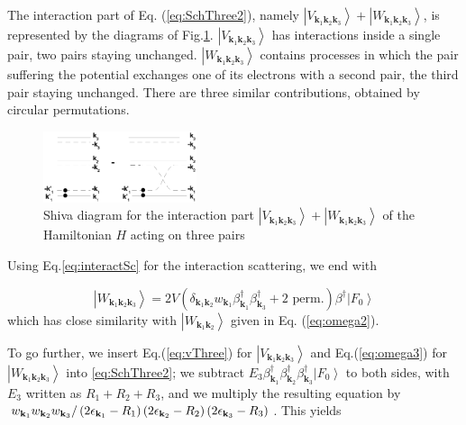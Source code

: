 \documentclass[aps,prb,superscriptaddress,showpacs,reprint,lengthcheck]{revtex4}
\begin{document}
The interaction part of Eq. (\ref{eq:SchThree2}), namely $\left|V_{\mathbf{k} _1\mathbf{k} _2%
\mathbf{k} _3}\right>+\left|W_{\mathbf{k} _1\mathbf{k} _2\mathbf{k} _3}\right> $, is represented by the diagrams of Fig.\ref{fig:threeP}. $\left|V_{\mathbf{k} _1\mathbf{k} _2
\mathbf{k} _3}\right>$ has interactions inside a single pair, two pairs
staying unchanged. $\left|W_{\mathbf{k} _1\mathbf{k} _2\mathbf{k} _3}\right> $ contains processes in which the pair suffering the potential exchanges one of its electrons with a second pair, the third pair staying unchanged.  There  are three similar  contributions, obtained by circular permutations.
\begin{figure}[htb]
   \includegraphics[width=0.4\textwidth]{threePair.eps}
\caption{Shiva diagram for the interaction part $\left|V_{\mathbf{k} _1\mathbf{k} _2
\mathbf{k} _3}\right> +\left|W_{\mathbf{k} _1\mathbf{k} _2
\mathbf{k} _3}\right>$ of the Hamiltonian $H$ acting on three pairs }\label{fig:threeP}
 \end{figure}

Using Eq.\eqref{eq:interactSc} for the interaction scattering, we end with

\begin{equation}\label{eq:omega3}
\left|W_{\mathbf{k} _1\mathbf{k} _2\mathbf{k} _3}\right>= 2V(\delta_{\mathbf{k} _1\mathbf{k} _2}w_{\mathbf{k} _1}\beta^{\dagger}_{\mathbf{k} _1}\beta^{\dagger}_{\mathbf{k} _3}+ \text{2 perm.})\beta^{\dagger}\left|F_0\right>
\end{equation}
which has close similarity with  $\left|W_{\mathbf{k} _1\mathbf{k} _2}\right> $ given in Eq. (\ref{eq:omega2}). 



To go further, we insert Eq.(\ref{eq:vThree}) for $\left|V_{\mathbf{k} _1\mathbf{k} _2\mathbf{k} _3}\right>$  and Eq.(\ref{eq:omega3}) for $\left|W_{\mathbf{k} _1\mathbf{k} _2\mathbf{k} _3}\right> $ into \eqref{eq:SchThree2}; we subtract $E
_3\beta^{\dagger}_{\mathbf{k} _1}\beta^{\dagger}_{\mathbf{k}
_2}\beta^{\dagger}_{\mathbf{k} _3}\left|F_0\right>  $ to both sides, with $%
E _3$ written as $R_1+R_2+R_3$, and we multiply the resulting equation
by $w_{\mathbf{k} _1}w_{\mathbf{k} _2}w_{\mathbf{k} _3}/\left(2\epsilon_{%
\mathbf{k} _1}-R_1\right) \left(2\epsilon_{\mathbf{k} _2}-R_2\right)
\left(2\epsilon_{\mathbf{k} _3}-R_3\right) $. This yields
\end{document}
